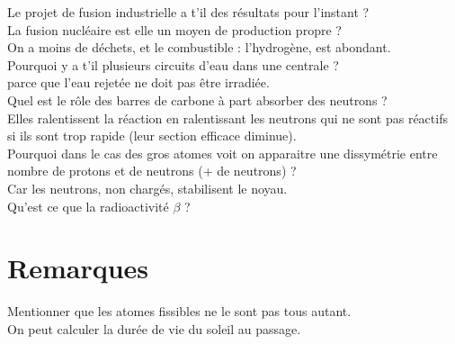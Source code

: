 \documentclass[12pt,prb,aps,epsf]{article}
\begin{document}
Le projet de fusion industrielle a t'il des résultats pour l'instant ?\\


La fusion nucléaire est elle un moyen de production propre ?\\
On a moins de déchets, et le combustible : l'hydrogène, est abondant.\\

Pourquoi y a t'il plusieurs circuits d'eau dans une centrale ?\\
parce que l'eau rejetée ne doit pas être irradiée.\\

Quel est le rôle des barres de carbone à part absorber des neutrons ?\\
Elles ralentissent la réaction en ralentissant les neutrons qui ne sont pas réactifs si ils sont trop rapide (leur section efficace diminue).\\

Pourquoi dans le cas des gros atomes voit on apparaitre une dissymétrie entre nombre de protons et de neutrons (+ de neutrons) ?\\
Car les neutrons, non chargés, stabilisent le noyau.\\

Qu'est ce que la radioactivité $\beta$ ?

\section*{Remarques}
Mentionner que les atomes fissibles ne le sont pas tous autant.\\
On peut calculer la durée de vie du soleil au passage.
	
	
	
\end{document}
